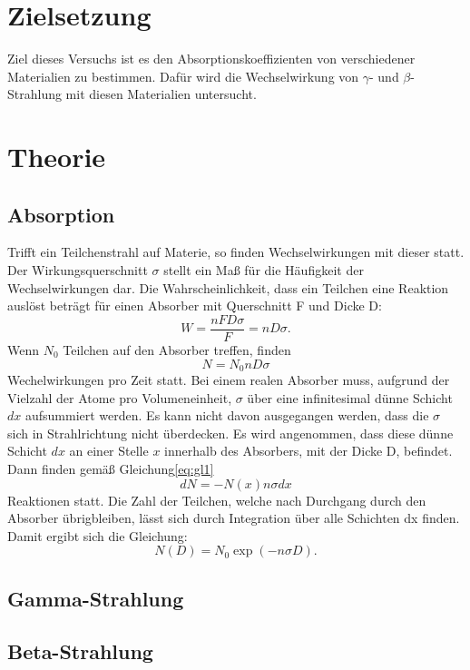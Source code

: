 \section{Zielsetzung}
Ziel dieses Versuchs ist es den Absorptionskoeffizienten von verschiedener Materialien zu bestimmen.
Dafür wird die Wechselwirkung von $\gamma$- und $\beta$-Strahlung mit diesen Materialien untersucht.
\section{Theorie}
\label{sec:Theorie}
\subsection{Absorption}
Trifft ein Teilchenstrahl auf Materie, so finden Wechselwirkungen mit dieser statt.
Der Wirkungsquerschnitt $\sigma$ stellt ein Maß für die Häufigkeit der Wechselwirkungen dar.
Die Wahrscheinlichkeit, dass ein Teilchen eine Reaktion auslöst beträgt für einen Absorber mit Querschnitt F und Dicke D:
\begin{equation}
  W= \frac{nFD\sigma}{F}= nD \sigma    .
\end{equation}
Wenn $N_0$ Teilchen auf den Absorber treffen, finden
\begin{equation}
  N = N_0 nD \sigma
  \label{eq:gl1}
\end{equation}
Wechelwirkungen pro Zeit statt.
Bei einem realen Absorber muss, aufgrund der Vielzahl der Atome pro Volumeneinheit, $\sigma$ über eine infinitesimal dünne Schicht $dx$ aufsummiert werden.
Es kann nicht davon ausgegangen werden, dass die $\sigma$ sich in Strahlrichtung nicht überdecken.
Es wird angenommen, dass diese dünne Schicht $dx$ an einer Stelle $x$ innerhalb des Absorbers, mit der Dicke D, befindet.
Dann finden gemäß Gleichung\eqref{eq:gl1}
\begin{equation}
  dN = -N(x) n \sigma dx
\end{equation}
Reaktionen statt.
Die Zahl der Teilchen, welche nach Durchgang durch den Absorber übrigbleiben, lässt sich durch Integration über alle Schichten dx finden.
Damit ergibt sich die Gleichung:
\begin{equation}
  N(D) = N_0 \exp(-n\sigma D)  .
\end{equation}

\subsection{Gamma-Strahlung}

\subsection{Beta-Strahlung}
